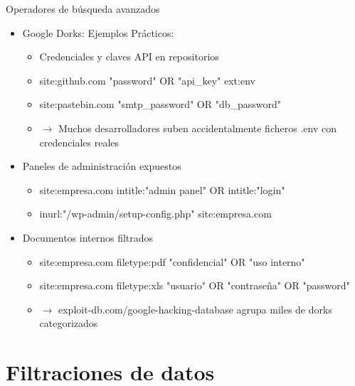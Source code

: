 \documentclass[aspectratio=169,11pt]{beamer}
\begin{document}
\begin{frame}[allowframebreaks]{Operadores de búsqueda avanzados}
\small
  \begin{itemize}
  \item Google Dorks: Ejemplos Prácticos:
    \begin{itemize}

  \item Credenciales y claves API en repositorios
  \item site:github.com "password" OR "api\_key" ext:env
  \item site:pastebin.com "smtp\_password" OR "db\_password"
  \item $\rightarrow$ Muchos desarrolladores suben accidentalmente ficheros .env con credenciales reales
      \end{itemize}

  \item Paneles de administración expuestos
      \begin{itemize}

  \item site:empresa.com intitle:"admin panel" OR intitle:"login"
  \item inurl:"/wp-admin/setup-config.php" site:empresa.com
        \end{itemize}

  \item Documentos internos filtrados
        \begin{itemize}

  \item site:empresa.com filetype:pdf "confidencial" OR "uso interno"
  \item site:empresa.com filetype:xls "usuario" OR "contraseña" OR "password"
  \item $\rightarrow$ exploit-db.com/google-hacking-database agrupa miles de dorks categorizados
          \end{itemize}

  \end{itemize}
\end{frame}

\section{Filtraciones de datos}
\end{document}
